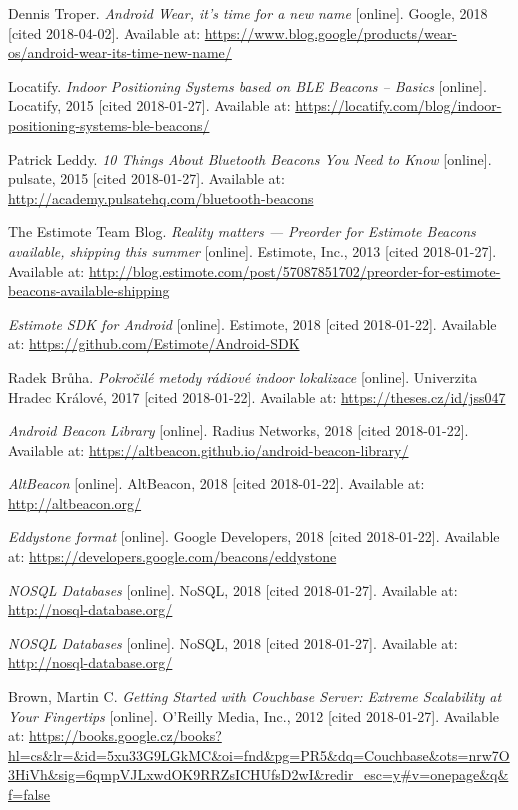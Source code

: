 \begin{thebibliography}{10}
Dennis Troper. \textit{Android Wear, it’s time for a new name} [online]. Google, 2018 [cited 2018-04-02]. Available at: \url{https://www.blog.google/products/wear-os/android-wear-its-time-new-name/}

Locatify. \textit{Indoor Positioning Systems based on BLE Beacons – Basics} [online]. Locatify, 2015 [cited 2018-01-27]. Available at: \url{https://locatify.com/blog/indoor-positioning-systems-ble-beacons/}

Patrick Leddy. \textit{10 Things About Bluetooth Beacons You Need to Know} [online]. pulsate, 2015 [cited 2018-01-27]. Available at: \url{http://academy.pulsatehq.com/bluetooth-beacons}

The Estimote Team Blog. \textit{Reality matters — Preorder for Estimote Beacons available, shipping this summer} [online]. Estimote, Inc., 2013 [cited 2018-01-27]. Available at: \url{http://blog.estimote.com/post/57087851702/preorder-for-estimote-beacons-available-shipping}

\textit{Estimote SDK for Android} [online]. Estimote, 2018 [cited 2018-01-22]. Available at: \url{https://github.com/Estimote/Android-SDK}

Radek Brůha. \textit{Pokročilé metody rádiové indoor lokalizace} [online]. Univerzita Hradec Králové, 2017 [cited 2018-01-22]. Available at: \url{https://theses.cz/id/jss047}

\textit{Android Beacon Library} [online]. Radius Networks, 2018 [cited 2018-01-22]. Available at: \url{https://altbeacon.github.io/android-beacon-library/}

\textit{AltBeacon} [online]. AltBeacon, 2018 [cited 2018-01-22]. Available at: \url{http://altbeacon.org/}

\textit{Eddystone format} [online]. Google Developers, 2018 [cited 2018-01-22]. Available at: \url{https://developers.google.com/beacons/eddystone}

\textit{NOSQL Databases} [online]. NoSQL, 2018 [cited 2018-01-27]. Available at: \url{http://nosql-database.org/}

\textit{NOSQL Databases} [online]. NoSQL, 2018 [cited 2018-01-27]. Available at: \url{http://nosql-database.org/}

Brown, Martin C. \textit{Getting Started with Couchbase Server: Extreme Scalability at Your Fingertips} [online]. O'Reilly Media, Inc., 2012 [cited 2018-01-27]. Available at: \url{https://books.google.cz/books?hl=cs&lr=&id=5xu33G9LGkMC&oi=fnd&pg=PR5&dq=Couchbase&ots=nrw7O3HiVh&sig=6qmpVJLxwdOK9RRZsICHUfsD2wI&redir_esc=y#v=onepage&q&f=false}


\end{thebibliography}
